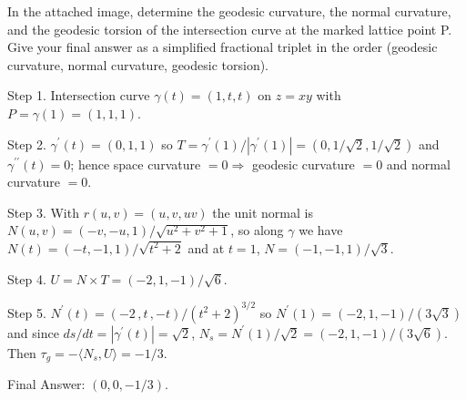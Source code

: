 In the attached image, determine the geodesic curvature, the normal curvature, and the geodesic torsion of the intersection curve at the marked lattice point P. Give your final answer as a simplified fractional triplet in the order (geodesic curvature, normal curvature, geodesic torsion).

Step 1. Intersection curve $\gamma(t)=(1,t,t)$ on $z=xy$ with $P=\gamma(1)=(1,1,1)$.

Step 2. $\gamma^{\prime}(t)=(0,1,1)$ so $T=\gamma^{\prime}(1)/|\gamma^{\prime}(1)|=(0,1/\sqrt{2},1/\sqrt{2})$ and $\gamma^{\prime\prime}(t)=0$; hence space curvature $=0 \Rightarrow$ geodesic curvature $=0$ and normal curvature $=0$.

Step 3. With $r(u,v)=(u,v,uv)$ the unit normal is $N(u,v)=(-v,-u,1)/\sqrt{u^{2}+v^{2}+1}$, so along $\gamma$ we have $N(t)=(-t,-1,1)/\sqrt{t^{2}+2}$ and at $t=1$, $N=(-1,-1,1)/\sqrt{3}$.

Step 4. $U=N\times T=(-2,1,-1)/\sqrt{6}$.

Step 5. $N^{\prime}(t)=(-2\,,t\,,-t)/(t^{2}+2)^{3/2}$ so $N^{\prime}(1)=(-2,1,-1)/(3\sqrt{3})$ and since $ds/dt=|\gamma^{\prime}(t)|=\sqrt{2}$, $N_{s}=N^{\prime}(1)/\sqrt{2}=(-2,1,-1)/(3\sqrt{6})$. Then $\tau_{g}=-\langle N_{s},U\rangle=-1/3$.

Final Answer: $(0,0,-1/3)$.